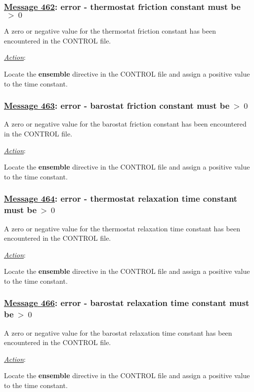 \subsubsection*{\underline{Message 462}: error - thermostat friction constant must be$~>~0$}

A zero or negative value for the thermostat
friction constant has been encountered in the CONTROL file.

\noindent \underline{\em Action}:

Locate the {\bf ensemble} directive in the CONTROL file and assign a
positive value to the time constant.

\subsubsection*{\underline{Message 463}: error - barostat friction constant must be$~>~0$}

A zero or negative value for the barostat
friction constant has been encountered in the CONTROL file.

\noindent \underline{\em Action}:

Locate the {\bf ensemble} directive in the CONTROL file and assign a
positive value to the time constant.

\subsubsection*{\underline{Message 464}: error - thermostat relaxation time constant must be$~>~0$}

A zero or negative value for the thermostat
relaxation time constant has been encountered in the CONTROL file.

\noindent \underline{\em Action}:

Locate the {\bf ensemble} directive in the CONTROL file and assign
a positive value to the time constant.

\subsubsection*{\underline{Message 466}: error - barostat relaxation time constant must be$~>~0$}

A zero or negative value for the barostat relaxation
time constant has been encountered in the CONTROL file.

\noindent \underline{\em Action}:

Locate the {\bf ensemble} directive in the CONTROL file and assign
a positive value to the time constant.

